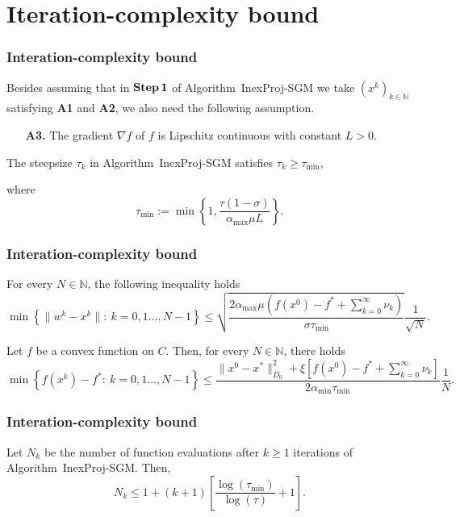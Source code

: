 \documentclass[xcolor=dvipsnames,aspectratio=169,13pt]{beamer} %
\begin{document}
\section{Iteration-complexity bound}


\begin{frame}[t]\frametitle{Interation-complexity bound}
    Besides  assuming   that  in ${\bf Step\,1}$ of  Algorithm~InexProj-SGM we take   $(x^k)_{k\in\mathbb{N}}$ satisfying {\bf A1} and {\bf A2},  we also need the following assumption.
\begin{itemize}
  \item[{\bf A3.}] The  gradient $\nabla f$ of $f$ is  Lipschitz continuous with constant $L>0$.
\end{itemize}


\begin{lemma}
  The steepsize $\tau_k$ in Algorithm~InexProj-SGM satisfies $\tau_k \geq \tau_{\min}$,
\end{lemma}
where 
\begin{equation*}
  \tau_{\min} := \min \left\{1, \frac{\tau(1-\sigma)}{{\alpha_{\max}}\mu L}\right\}.
\end{equation*}
\end{frame}


\begin{frame}[t]\frametitle{Interation-complexity bound}
\begin{theorem} 
  For every $N \in \mathbb{N}$, the following inequality holds
  $$
    \min\left\{\|w^k-x^k\| :~ k= 0, 1 \ldots, N-1\right\} \leq \sqrt{\frac{2{\alpha_{\max}}\mu\left(f(x^0)-f^* +\sum_{k= 0}^{\infty}\nu_k\right) }{\sigma \tau_{\min}}} \frac{1}{\sqrt{N}}.
  $$
\end{theorem}

\begin{theorem} 
  Let $f$ be a convex function on $C$. Then, for every $N \in \mathbb{N}$, there holds
  $$
    \min \left\{f(x^k) - f^* :~k = 0, 1 \ldots, N-1\right\} \leq \frac{\|x^0 - x^*\|^2_{D_0} + \xi\left[f(x^0)-f^*+ \sum_{k=0}^{\infty} \nu_k\right]}{2 \alpha_{\min} \tau_{\min}}\frac{1}{N}.
  $$
\end{theorem}
\end{frame}

\begin{frame}[c]\frametitle{Interation-complexity bound}
  \begin{lemma} 
  Let $N_{k}$ be  the number of function evaluations after $k\geq 1$ iterations of Algorithm~InexProj-SGM. Then,  
  \[N_{k}\leq 1+ (k+1)\left[\frac{\log (\tau_{\min})}{\log(\tau)}+1 \right].\]
\end{lemma}
\end{frame}
\end{document}

